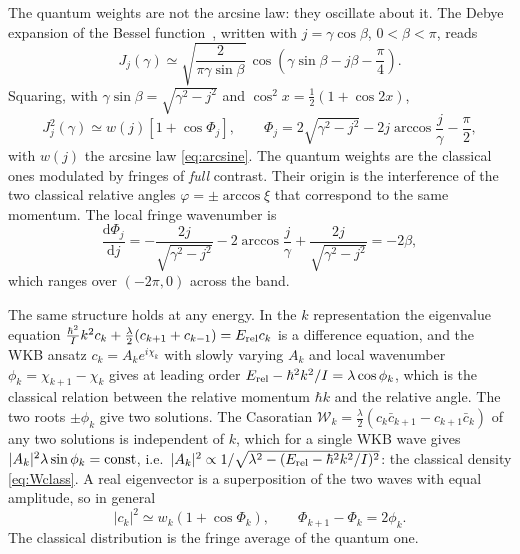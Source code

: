 \documentclass[preprint,12pt]{elsarticle}
\newcommand{\dd}{\mathrm{d}}
\newcommand{\Erel}{E_{\rm rel}}
\begin{document}
The quantum weights are not the arcsine law: they oscillate about it. The
Debye expansion of the Bessel function~\cite{DLMF10}, written with
$j=\gamma\cos\beta$, $0<\beta<\pi$, reads
\begin{equation}
J_{j}(\gamma)\simeq\sqrt{\frac{2}{\pi\gamma\sin\beta}}\,
\cos\left(\gamma\sin\beta-j\beta-\frac{\pi}{4}\right).
\end{equation}
Squaring, with $\gamma\sin\beta=\sqrt{\gamma^{2}-j^{2}}$ and
$\cos^{2}x=\tfrac12(1+\cos2x)$,
\begin{equation}
J_{j}^{2}(\gamma)\simeq w(j)\left[1+\cos\Phi_{j}\right],\qquad
\Phi_{j}=2\sqrt{\gamma^{2}-j^{2}}-2j\arccos\frac{j}{\gamma}-\frac{\pi}{2},
\label{eq:fringes}
\end{equation}
with $w(j)$ the arcsine law \eqref{eq:arcsine}. The quantum weights are the
classical ones modulated by fringes of \emph{full} contrast. Their origin is the
interference of the two classical relative angles $\varphi=\pm\arccos\xi$ that
correspond to the same momentum. The local fringe wavenumber is
\begin{equation}
\frac{\dd\Phi_{j}}{\dd j}=-\frac{2j}{\sqrt{\gamma^{2}-j^{2}}}
-2\arccos\frac{j}{\gamma}+\frac{2j}{\sqrt{\gamma^{2}-j^{2}}}=-2\beta,
\end{equation}
which ranges over $(-2\pi,0)$ across the band.

The same structure holds at any energy. In the $k$ representation the
eigenvalue equation $\frac{\hbar^{2}}{I}k^{2}c_{k}+\frac{\lambda}{2}(c_{k+1}+
c_{k-1})=\Erel c_{k}$ is a difference equation, and the WKB ansatz
$c_{k}=A_{k}e^{i\chi_{k}}$ with slowly varying $A_{k}$ and local wavenumber
$\phi_{k}=\chi_{k+1}-\chi_{k}$ gives at leading order
$\Erel-\hbar^{2}k^{2}/I=\lambda\cos\phi_{k}$, which is the classical relation
between the relative momentum $\hbar k$ and the relative angle. The two roots
$\pm\phi_{k}$ give two solutions. The Casoratian
$\mathcal{W}_{k}=\tfrac{\lambda}{2}(c_{k}\bar c_{k+1}-c_{k+1}\bar c_{k})$ of
any two solutions is independent of $k$, which for a single WKB wave gives
$|A_{k}|^{2}\lambda\sin\phi_{k}={\rm const}$, i.e.\
$|A_{k}|^{2}\propto1/\sqrt{\lambda^{2}-(\Erel-\hbar^{2}k^{2}/I)^{2}}$: the
classical density \eqref{eq:Wclass}. A real eigenvector is a superposition of
the two waves with equal amplitude, so in general
\begin{equation}
|c_{k}|^{2}\simeq w_{k}\left(1+\cos\Phi_{k}\right),\qquad
\Phi_{k+1}-\Phi_{k}=2\phi_{k}.
\label{eq:fringesgen}
\end{equation}
The classical distribution is the fringe average of the quantum one.
\end{document}
